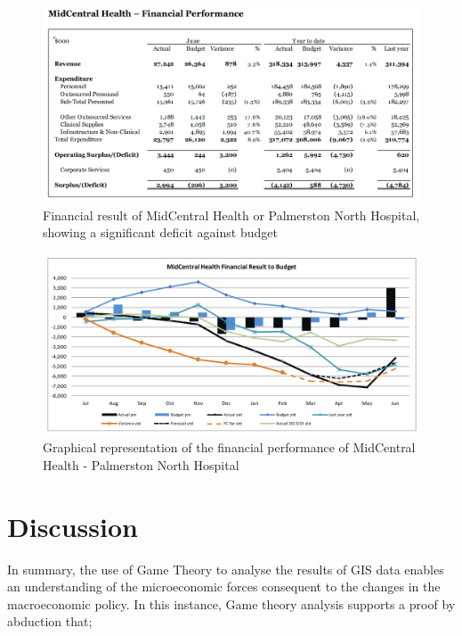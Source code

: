 \documentclass[11pt,a4paper]{article}
\begin{document}
\begin{figure}[htp]
\centering
\includegraphics[scale=0.30]{MCHbalance.png}
\caption{Financial result of MidCentral Health or Palmerston North Hospital, showing a significant deficit against budget }
\label{Financial result for MidCentral Health - Palmerston North Hospital}
\end{figure}

\begin{figure}[htp]
\centering
\includegraphics[scale=0.30]{MCHgraph.png}
\caption{Graphical representation of the financial performance of MidCentral Health - Palmerston North Hospital}
\label{}
\end{figure}

\pagebreak

\section{Discussion}
In summary, the use of Game Theory to analyse the results of GIS data enables an understanding of the microeconomic forces consequent to the changes in the macroeconomic policy. In this instance, Game theory analysis supports a proof by abduction that;
\end{document}
